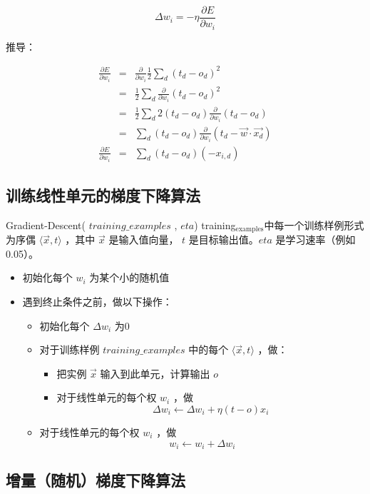 \documentclass{article}
\begin{document}
\[\Delta w_{i} = -\eta  \frac{\partial E}{\partial w_{i}}\]

推导：

\begin{eqnarray}
\frac{\partial E}{\partial w_{i}} & = & \frac{\partial}{\partial w_{i}} \frac{1}{2}\sum_{d}(t_{d} - o_{d})^{2} \nonumber\\
 & = & \frac{1}{2}\sum_{d}\frac{\partial}{\partial w_{i}}
  (t_{d} - o_{d})^{2} \nonumber\\
 & = & \frac{1}{2}\sum_{d} 2 (t_{d} - o_{d}) 
\frac{\partial}{\partial w_{i}}(t_{d} - o_{d}) \nonumber\\
 & = & \sum_{d} (t_{d} - o_{d}) 
\frac{\partial}{\partial w_{i}}(t_{d} - \vec{w} \cdot \vec{x_{d}}) \nonumber\\
\frac{\partial E}{\partial w_{i}} & = & \sum_{d} (t_{d} - o_{d}) (- x_{i,d}) \nonumber
\end{eqnarray}
\subsection{训练线性单元的梯度下降算法}
\label{sec-5-2}


Gradient-Descent( $training\_examples$ , $eta$)
training$_{\mathrm{examples}}$中每一个训练样例形式为序偶 $\langle \vec{x}, t \rangle$ ，其中 $\vec{x}$ 是输入值向量， $t$ 是目标输出值。$eta$ 是学习速率（例如0.05）。
\begin{itemize}
\item 初始化每个 $w_{i}$ 为某个小的随机值
\item 遇到终止条件之前，做以下操作：
\begin{itemize}
\item 初始化每个 $\Delta w_{i}$ 为0
\item 对于训练样例 $training\_examples$ 中的每个 $\langle \vec{x},t \rangle$ ，做：
\begin{itemize}
\item 把实例 $\vec{x}$ 输入到此单元，计算输出 $o$
\item 对于线性单元的每个权 $w_{i}$ ，做
            \[\Delta w_{i} \leftarrow \Delta w_{i} + \eta (t - o) x_{i}\]
\end{itemize}
\item 对于线性单元的每个权 $w_{i}$ ，做
            \[w_{i} \leftarrow w_{i} + \Delta w_{i}\]
\end{itemize}
\end{itemize}
\subsection{增量（随机）梯度下降算法}
\label{sec-5-3}
\end{document}

